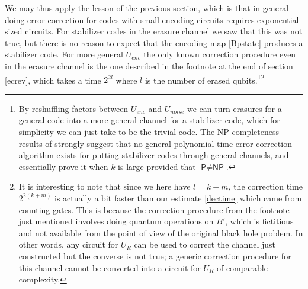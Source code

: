 \documentclass[12pt]{article}
\newcommand{\textcs}[1]{\textsf{#1}}
\newcommand{\NP}{\textcs{NP}}
\begin{document}
We may thus apply the lesson of the previous section, which is that in general doing error correction for codes with small encoding circuits requires exponential sized circuits.  For stabilizer codes in the erasure channel we saw that this was not true, but there is no reason to expect that the encoding map \eqref{Bpstate} produces a stabilizer code.  For more general $U_{enc}$ the only known correction procedure even in the erasure channel is the one described in the footnote at the end of section \ref{ecrev}, which takes a time $2^{2l}$ where $l$ is the number of erased qubits.\footnote{By reshuffling factors between $U_{enc}$ and $U_{noise}$ we can turn erasures for a general code into a more general channel for a stabilizer code, which for simplicity we can just take to be the trivial code.  The \NP-completeness results of \cite{hsieh2011np} strongly suggest that no general polynomial time error correction algorithm exists for putting stabilizer codes through general channels, and essentially prove it when $k$ is large provided that $\textcs{P}\neq \NP$.}\footnote{It is interesting to note that since we here have $l=k+m$, the correction time $2^{2(k+m)}$ is actually a bit faster than our estimate \eqref{dectime} which came from counting gates.  This is because the correction procedure from the footnote just mentioned involves doing quantum operations on $B'$, which is fictitious and not available from the point of view of the original black hole problem.  In other words, any circuit for $U_R$ can be used to correct the channel just constructed but the converse is not true; a generic correction procedure for this channel cannot be converted into a circuit for $U_R$ of comparable complexity.}
\end{document}
